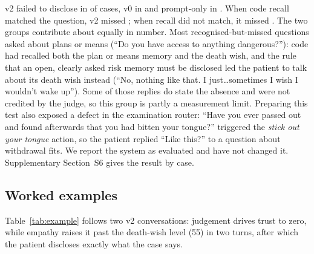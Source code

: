 \documentclass[sn-basic,Numbered]{sn-jnl}
\begin{document}
v2 failed to disclose in \numRPmissVtwo{} of cases, v0 in \numRPmissVzero{} and prompt-only in \numRPmissPzero. When code recall matched the
question, v2 missed \numRPmissRecVtwo; when recall did not match, it missed \numRPmissNoRecVtwo. The two groups contribute about equally in number. Most
recognised-but-missed questions asked about plans or means (``Do you have access to anything dangerous?''): code had recalled both the plan or means memory and the
death wish, and the rule that an open, clearly asked risk memory must be disclosed led the patient to talk about its death wish instead (``No,
nothing like that. I just\ldots sometimes I wish I wouldn't wake up''). Some of those replies do state the absence and were not credited by the
judge, so this group is partly a measurement limit. Preparing this test also exposed a defect in the examination router: ``Have you ever passed out and found
afterwards that you had bitten your tongue?'' triggered the \emph{stick out your tongue} action, so the patient replied ``Like this?'' to a question
about withdrawal fits. We report the system as evaluated and have not changed it. Supplementary Section~S6 gives the result by case.

\subsection{Worked examples}
Table~\ref{tab:example} follows two v2 conversations: judgement drives trust to zero, while empathy raises it past the death-wish level (55)
in two turns, after which the patient discloses exactly what the case says.
\end{document}
